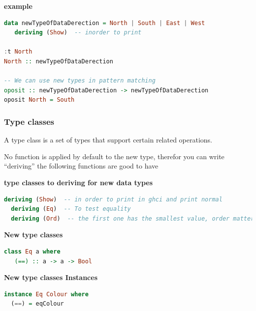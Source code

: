 \textbf{example}
\begin{lstlisting}[language=Haskell]
data newTypeOfDataDerection = North | South | East | West
   deriving (Show)  -- inorder to print

:t North 
North :: newTypeOfDataDerection 

-- We can use new types in pattern matching 
oposit :: newTypeOfDataDerection -> newTypeOfDataDerection 
oposit North = South
\end{lstlisting}

\subsubsection{Type classes}
A type class is a set of types that support certain related operations.

No function is applied by default to the new type, therefor
you can write ``deriving'' the following functions are good to have

\noindent\textbf{type classes to deriving for new data types}
\begin{lstlisting}[language=Haskell]
  deriving (Show)  -- in order to print in ghci and print normal
  deriving (Eq)  -- To test equality
  deriving (Ord)  -- the first one has the smallest value, order matter for comparison
\end{lstlisting}
\vspace{5mm}

\noindent\textbf{New type classes}
\begin{lstlisting}[language=Haskell]
class Eq a where
   (==) :: a -> a -> Bool
\end{lstlisting}
\vspace{5mm}

\noindent\textbf{New type classes Instances}
\begin{lstlisting}[language=Haskell]
instance Eq Colour where
  (==) = eqColour
\end{lstlisting}

